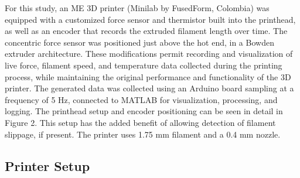 \documentclass[main.tex]{subfiles}
\begin{document}
For this study, an ME 3D printer (Minilab by FusedForm, Colombia) was equipped with a customized force sensor and thermistor built into the printhead, as well as an encoder that records the extruded filament length over time. The concentric force sensor was positioned just above the hot end, in a Bowden extruder architecture. These modifications permit recording and visualization of live force, filament speed, and temperature data collected during the printing process, while maintaining the original performance and functionality of the 3D printer. The generated data was collected using an Arduino board sampling at a frequency of 5 Hz, connected to MATLAB for visualization, processing, and logging. The printhead setup and encoder positioning can be seen in detail in Figure 2. This setup has the added benefit of allowing detection of filament slippage, if present. The printer uses 1.75 mm filament and a 0.4 mm nozzle. 
\subsection{Printer Setup} \label{sssec:printer}

% 
\end{document}
